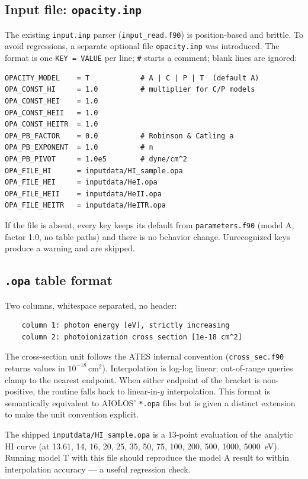 \documentclass[english,a4paper]{my_memo}
\begin{document}
\subsection{Input file: \texttt{opacity.inp}}

The existing \texttt{input.inp} parser (\texttt{input\_read.f90}) is
position-based and brittle. To avoid regressions, a separate optional file
\texttt{opacity.inp} was introduced. The format is one \texttt{KEY = VALUE}
per line; \texttt{\#} starts a comment; blank lines are ignored:

\begin{verbatim}
OPACITY_MODEL    = T            # A | C | P | T  (default A)
OPA_CONST_HI     = 1.0          # multiplier for C/P models
OPA_CONST_HEI    = 1.0
OPA_CONST_HEII   = 1.0
OPA_CONST_HEITR  = 1.0
OPA_PB_FACTOR    = 0.0          # Robinson & Catling a
OPA_PB_EXPONENT  = 1.0          # n
OPA_PB_PIVOT     = 1.0e5        # dyne/cm^2
OPA_FILE_HI      = inputdata/HI_sample.opa
OPA_FILE_HEI     = inputdata/HeI.opa
OPA_FILE_HEII    = inputdata/HeII.opa
OPA_FILE_HEITR   = inputdata/HeITR.opa
\end{verbatim}

If the file is absent, every key keeps its default from
\texttt{parameters.f90} (model A, factor 1.0, no table paths) and there is
no behavior change. Unrecognized keys produce a warning and are skipped.

\subsection{\texttt{.opa} table format}

Two columns, whitespace separated, no header:
\begin{verbatim}
    column 1: photon energy [eV], strictly increasing
    column 2: photoionization cross section [1e-18 cm^2]
\end{verbatim}

The cross-section unit follows the ATES internal convention
(\texttt{cross\_sec.f90} returns values in $10^{-18}\,\mathrm{cm}^2$).
Interpolation is log-log linear; out-of-range queries clamp to the nearest
endpoint. When either endpoint of the bracket is non-positive, the routine
falls back to linear-in-$y$ interpolation. This format is semantically
equivalent to AIOLOS' \texttt{*.opa} files but is given a distinct extension
to make the unit convention explicit.

The shipped \texttt{inputdata/HI\_sample.opa} is a 13-point evaluation of
the analytic HI curve (at 13.61, 14, 16, 20, 25, 35, 50, 75, 100, 200, 500,
1000, 5000~eV). Running model T with this file should reproduce the model A
result to within interpolation accuracy --- a useful regression check.
\end{document}
